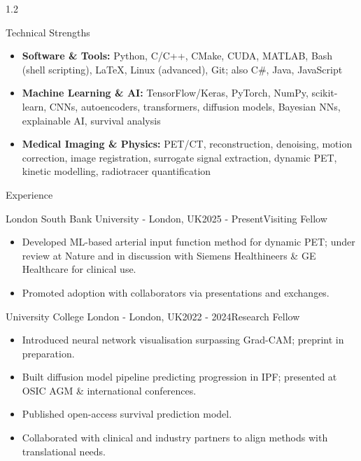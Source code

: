 \documentclass{cv}
\begin{document}
    
    \begin{spacing}{1.2}
        \vspace{0.5cm}
        \begin{rSection}{Technical Strengths}
            \begin{itemize}
                \item \textbf{Software \& Tools:} Python, C/C++, CMake, CUDA, MATLAB, Bash (shell scripting), LaTeX, Linux (advanced), Git; also C\#, Java, JavaScript
                \item \textbf{Machine Learning \& AI:} TensorFlow/Keras, PyTorch, NumPy, scikit-learn, CNNs, autoencoders, transformers, diffusion models, Bayesian NNs, explainable AI, survival analysis
                \item \textbf{Medical Imaging \& Physics:} PET/CT, reconstruction, denoising, motion correction, image registration, surrogate signal extraction, dynamic PET, kinetic modelling, radiotracer quantification
            \end{itemize}
        \end{rSection}
        
        \begin{rSection}{Experience}
            \item \begin{rSubsection}{London South Bank University \textnormal{- London, UK}}{2025 - Present}{Visiting Fellow}{}
                \item \begin{itemize}
                    \item Developed ML-based arterial input function method for dynamic PET; under review at Nature and in discussion with Siemens Healthineers \& GE Healthcare for clinical use.
                    \item Promoted adoption with collaborators via presentations and exchanges.
                \end{itemize}
            \end{rSubsection}
            
            \item \begin{rSubsection}{University College London \textnormal{- London, UK}}{2022 - 2024}{Research Fellow}{}
                \item \begin{itemize}
                    \item Introduced neural network visualisation surpassing Grad-CAM; preprint in preparation.
                    \item Built diffusion model pipeline predicting progression in IPF; presented at OSIC AGM \& international conferences.
                    \item Published open-access survival prediction model.
                    \item Collaborated with clinical and industry partners to align methods with translational needs.
                \end{itemize}
            \end{rSubsection}
            

\end{rSection}
\end{spacing}
\end{document}

